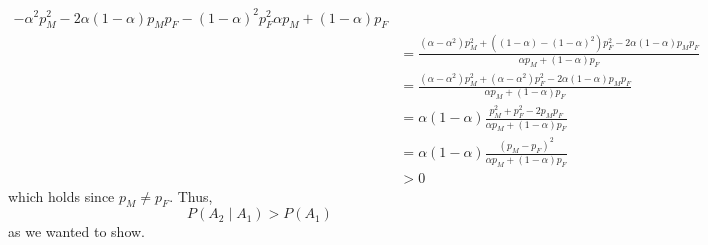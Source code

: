 \begin{solution*}
\begin{align*}
{      -\alpha^2p_M^2-2\alpha(1-\alpha)p_Mp_F
      -(1-\alpha)^2p_F^2}{\alpha p_M+(1-\alpha)p_F}\\
    &=\frac{(\alpha-\alpha^2)p_M^2+((1-\alpha)-(1-\alpha)^2)p_F^2-2\alpha(1-\alpha)p_Mp_F}
      {\alpha p_M+(1-\alpha)p_F}\\
    &=\frac{(\alpha-\alpha^2)p_M^2+(\alpha-\alpha^2)p_F^2-2\alpha(1-\alpha)p_Mp_F}
      {\alpha p_M+(1-\alpha)p_F}\\
    &=\alpha(1-\alpha)\frac{p_M^2+p_F^2-2p_Mp_F}{\alpha
      p_M+(1-\alpha)p_F}\\
    &=\alpha(1-\alpha)\frac{(p_M-p_F)^2}{\alpha
      p_M+(1-\alpha)p_F}\\
    &>0
  \end{align*}
  which holds since \(p_M\neq p_F\). Thus,
  \[
    P(A_2\mid A_1)>P(A_1)
  \]
  as we wanted to show.
\end{solution*}

